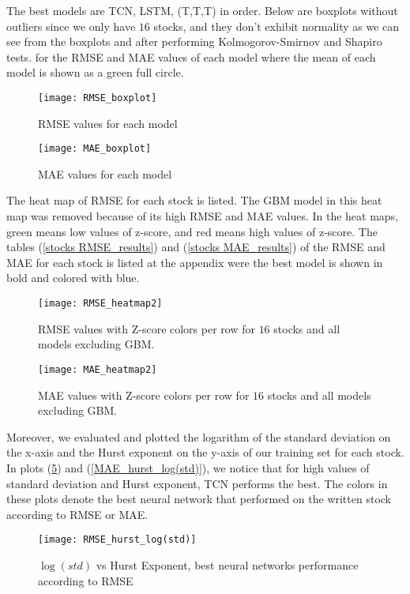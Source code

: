 \documentclass[12pt, A4]{article}
\begin{document}
The best models are TCN, LSTM, (T,T,T) in order. Below are boxplots without outliers since we only have $16$ stocks, and they don't exhibit normality as we can see from the boxplots and after performing Kolmogorov-Smirnov and Shapiro tests. for the RMSE and MAE values of each model where the mean of each model is shown as a green full circle.

\begin{figure}[H]
	\centering
	\texttt{[image: RMSE\_boxplot]}
	\caption{RMSE values for each model}
	\label{RMSE_boxplot}
\end{figure}

\begin{figure}[H]
	\centering
	\texttt{[image: MAE\_boxplot]}
	\caption{MAE values for each model}
	\label{MAE_boxplot}
\end{figure}


The heat map of RMSE for each stock is listed. The GBM model in this heat map was removed because of its high RMSE and MAE values. In the heat maps, green means low values of z-score, and red means high values of z-score. The tables (\ref{stocks RMSE_results}) and (\ref{stocks MAE_results}) of the RMSE and MAE for each stock is listed at the appendix were the best model is shown in bold and colored with blue.

\begin{figure}[H]
	\centering
	\texttt{[image: RMSE\_heatmap2]}
	\caption{RMSE values with Z-score colors per row for $16$ stocks and all models excluding GBM.}
	\label{RMSE_heatmap}
\end{figure}

\begin{figure}[H]
	\centering
	\texttt{[image: MAE\_heatmap2]}
	\caption{MAE values with Z-score colors per row for $16$ stocks and all models excluding GBM.}
	\label{MAE_heatmap}
\end{figure}

Moreover, we evaluated and plotted the logarithm of the standard deviation on the x-axis and the Hurst exponent on the y-axis of our training set for each stock. In plots (\ref{RMSE_hurst_log(std)}) and (\ref{MAE_hurst_log(std)}), we notice that for high values of standard deviation and Hurst exponent, TCN performs the best. The colors in these plots denote the best neural network that performed on the written stock according to RMSE or MAE.

\begin{figure}[H]
	\centering
	\texttt{[image: RMSE\_hurst\_log(std)]}
	\caption{$\log(std)$ vs Hurst Exponent, best neural networks performance according to RMSE}
	\label{RMSE_hurst_log(std)}
\end{figure}
\end{document}
